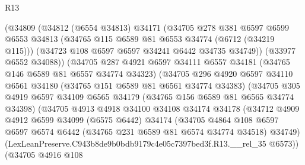 \begin{lexlean}{R13}
\begin{coremodule}
                    (@34809
                      (@34812
                        (@6554 @34813)
                        @34171
                        (@34705
                          @278
                          @381
                          @6597
                          @6599
                          @6553
                          @34813
                          (@34765 @115 @6589 @81 @6553 @34774 (@6712 (@34219 @115)))
                          (@34723 @108 @6597 @6597 @34241 @6442 @34735 @34749))
                        (@33977 @6552 @34088))
                      (@34705
                        @287
                        @4921
                        @6597
                        @34111
                        @6557
                        @34181
                        (@34765 @146 @6589 @81 @6557 @34774 @34323)
                        (@34705
                          @296
                          @4920
                          @6597
                          @34110
                          @6561
                          @34180
                          (@34765 @151 @6589 @81 @6561 @34774 @34383)
                          (@34705
                            @305
                            @4919
                            @6597
                            @34109
                            @6565
                            @34179
                            (@34765 @156 @6589 @81 @6565 @34774 @34398)
                            (@34705
                              @4913
                              @4918
                              @34100
                              @34108
                              @34174
                              @34178
                              (@34712
                                @4909
                                @4912
                                @6599
                                @34099
                                (@6575 @6442)
                                @34174
                                (@34705
                                  @4864
                                  @108
                                  @6597
                                  @6597
                                  @6574
                                  @6442
                                  (@34765 @231 @6589 @81 @6574 @34774 @34518)
                                  @34749)
                                (LexLeanPreserve.C943b8de9b0bdb9179c4e05c7397bed3f.R13.__rel_35
                                  @6573))
                              (@34705
                                @4916
                                @108

\end{coremodule}
\end{lexlean}
